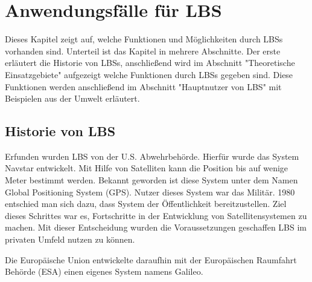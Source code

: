 \section{Anwendungsfälle für LBS}

%
Dieses Kapitel zeigt auf, welche Funktionen und Möglichkeiten durch LBSs vorhanden sind. Unterteil ist das Kapitel in mehrere Abschnitte. Der erste erläutert die Historie von LBSs, anschließend wird im Abschnitt "Theoretische Einsatzgebiete" aufgezeigt welche Funktionen durch LBSs gegeben sind. Diese Funktionen werden anschließend im Abschnitt "Hauptnutzer von LBS" mit Beispielen aus der Umwelt erläutert.


\subsection{Historie von LBS}
Erfunden wurden LBS von der U.S. Abwehrbehörde. Hierfür wurde das System Navstar entwickelt. Mit Hilfe von Satelliten kann die Position bis auf wenige Meter bestimmt werden. Bekannt geworden ist diese System unter dem Namen Global Positioning System (GPS). Nutzer dieses System war das Militär. 1980 entschied man sich dazu, dass System der Öffentlichkeit bereitzustellen. Ziel dieses Schrittes war es, Fortschritte in der Entwicklung von Satellitensystemen zu machen. Mit dieser Entscheidung wurden die Voraussetzungen geschaffen LBS im privaten Umfeld nutzen zu können.\cite{Navstar} 

Die Europäische Union entwickelte daraufhin mit der Europäischen Raumfahrt Behörde (ESA) einen eigenes System namens Galileo.

